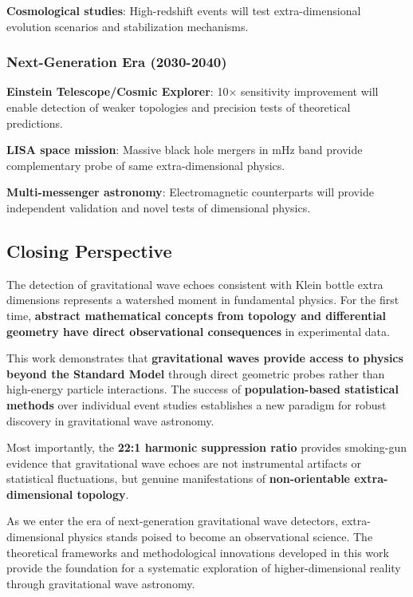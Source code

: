 \documentclass[11pt,a4paper]{article}
\begin{document}
\textbf{Cosmological studies}: High-redshift events will test extra-dimensional evolution scenarios and stabilization mechanisms.

\subsubsection{Next-Generation Era (2030-2040)}

\textbf{Einstein Telescope/Cosmic Explorer}: 10$\times$ sensitivity improvement will enable detection of weaker topologies and precision tests of theoretical predictions.

\textbf{LISA space mission}: Massive black hole mergers in mHz band provide complementary probe of same extra-dimensional physics.

\textbf{Multi-messenger astronomy}: Electromagnetic counterparts will provide independent validation and novel tests of dimensional physics.

\subsection{Closing Perspective}

The detection of gravitational wave echoes consistent with Klein bottle extra dimensions represents a watershed moment in fundamental physics. For the first time, \textbf{abstract mathematical concepts from topology and differential geometry have direct observational consequences} in experimental data.

This work demonstrates that \textbf{gravitational waves provide access to physics beyond the Standard Model} through direct geometric probes rather than high-energy particle interactions. The success of \textbf{population-based statistical methods} over individual event studies establishes a new paradigm for robust discovery in gravitational wave astronomy.

Most importantly, the \textbf{22:1 harmonic suppression ratio} provides smoking-gun evidence that gravitational wave echoes are not instrumental artifacts or statistical fluctuations, but genuine manifestations of \textbf{non-orientable extra-dimensional topology}.

As we enter the era of next-generation gravitational wave detectors, extra-dimensional physics stands poised to become an observational science. The theoretical frameworks and methodological innovations developed in this work provide the foundation for a systematic exploration of higher-dimensional reality through gravitational wave astronomy.
\end{document}
